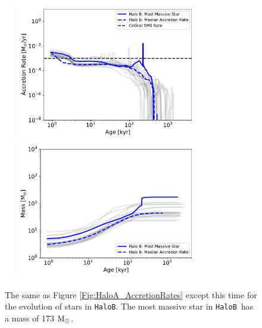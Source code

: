 \documentclass[twocolumn,iop,revtex4]{openjournal}
\newcommand{\msolarc} {$\rm{M_{\odot}}$}
\newcommand{\hb} {\texttt{HaloB~}}
\newcommand{\hbc} {\texttt{HaloB}}
\begin{document}


\begin{figure}
\centering
\begin{minipage}{175mm}      \begin{center}
    \centerline{
      \includegraphics[width=9.0cm, height=6cm]{FIGURES/AccretionRate_HaloB.pdf}
      \includegraphics[width=9.0cm, height=6cm]{FIGURES/Mass_HaloB.pdf}}
    \caption{
      The same as Figure \ref{Fig:HaloA_AccretionRates} except this time for the
      evolution of stars in \hbc. The most massive star in \hb has a mass of 173 \msolarc. 
    }
\label{Fig:HaloB_AccretionRates}
\end{center} \end{minipage}
\end{figure}

\end{document}
